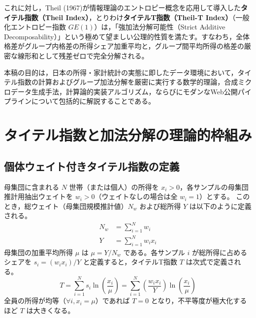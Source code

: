 \documentclass[paper=a4,fontsize=10.5pt,line_length=42zw]{jlreq}
\begin{document}
これに対し，Theil (1967)\cite{theil1967economics}が情報理論のエントロピー概念を応用して導入した\textbf{タイテル指数（Theil Index）}，とりわけ\textbf{タイテルT指数（Theil-T Index）}（一般化エントロピー指数 $GE(1)$）は，「強加法分解可能性（Strict Additive Decomposability）」という極めて望ましい公理的性質を満たす。すなわち，全体格差がグループ内格差の所得シェア加重平均と，グループ間平均所得の格差の厳密な線形和として残差ゼロで完全分解される\cite{shorrocks1980class,shorrocks1984inequality}。

本稿の目的は，日本の所得・家計統計の実態に即したデータ環境において，タイテル指数の計算およびグループ加法分解を厳密に実行する数学的理論，合成ミクロデータ生成手法，計算論的実装アルゴリズム，ならびにモダンなWeb公開パイプラインについて包括的に解説することである。

\section{タイテル指数と加法分解の理論的枠組み}

\subsection{個体ウェイト付きタイテル指数の定義}
母集団に含まれる $N$ 世帯（または個人）の所得を $x_i > 0$，各サンプルの母集団推計用抽出ウェイトを $w_i > 0$（ウェイトなしの場合は全 $w_i=1$）とする。
このとき，総ウェイト（母集団規模推計値）$N_w$ および総所得 $Y$ は以下のように定義される。
\begin{align}
    N_w &= \sum_{i=1}^N w_i \label{eq:total_weight} \\
    Y &= \sum_{i=1}^N w_i x_i \label{eq:total_income}
\end{align}
母集団の加重平均所得 $\mu$ は $\mu = Y / N_w$ である。各サンプル $i$ が総所得に占めるシェアを $s_i = (w_i x_i) / Y$ と定義すると，タイテルT指数 $T$ は次式で定義される。
\begin{equation}
    T = \sum_{i=1}^N s_i \ln \left( \frac{x_i}{\mu} \right) = \sum_{i=1}^N \left( \frac{w_i x_i}{Y} \right) \ln \left( \frac{x_i}{\mu} \right) \label{eq:theil_t}
\end{equation}
全員の所得が均等（$\forall i, x_i = \mu$）であれば $T = 0$ となり，不平等度が極大化するほど $T$ は大きくなる。
\end{document}
